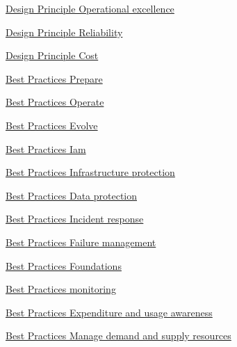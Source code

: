 \documentclass{article}
\begin{document}
\begin{thebibliography}{9}
\href{https://docs.aws.amazon.com/wellarchitected/latest/framework/oe-design-principles.html}{Design Principle Operational excellence}

\href{https://docs.aws.amazon.com/wellarchitected/latest/framework/rel-dp.html}{Design Principle Reliability}

\href{https://docs.aws.amazon.com/wellarchitected/latest/framework/cost-dp.html}{Design Principle Cost}


\href{https://docs.aws.amazon.com/wellarchitected/latest/framework/oe-prepare.html}{Best Practices Prepare}

\href{https://docs.aws.amazon.com/wellarchitected/latest/framework/oe-operate.html}{Best Practices Operate}

\href{https://docs.aws.amazon.com/wellarchitected/latest/framework/oe-evolve.html}{Best Practices Evolve}

\href{https://docs.aws.amazon.com/wellarchitected/latest/framework/sec-iam.html}{Best Practices Iam}

\href{https://docs.aws.amazon.com/wellarchitected/latest/framework/sec-infrastructure.html}{Best Practices Infrastructure protection}

\href{https://docs.aws.amazon.com/wellarchitected/latest/framework/sec-dataprot.html}{Best Practices Data protection}

\href{https://docs.aws.amazon.com/wellarchitected/latest/framework/sec-incresp.html}{Best Practices Incident response}

\href{https://docs.aws.amazon.com/wellarchitected/latest/framework/rel-failmgmt.html}{Best Practices Failure management}

\href{https://docs.aws.amazon.com/wellarchitected/latest/framework/rel-found.html}{Best Practices Foundations}

\href{https://docs.aws.amazon.com/wellarchitected/2022-03-31/framework/perf-monitoring.html}{Best Practices monitoring}

\href{https://docs.aws.amazon.com/wellarchitected/latest/framework/cost-aware.html}{Best Practices Expenditure and usage awareness}

\href{https://docs.aws.amazon.com/wellarchitected/latest/framework/cost-mandem.html}{Best Practices Manage demand and supply resources}



\end{thebibliography}
\end{document}
